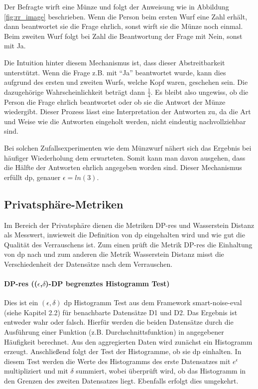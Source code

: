 Der Befragte wirft eine Münze und folgt der Anweisung wie in Abbildung \cref{fig:rr_image} beschrieben. Wenn die Person beim ersten Wurf eine Zahl erhält, dann beantwortet sie die Frage ehrlich, sonst wirft sie die Münze noch einmal. Beim zweiten Wurf folgt bei Zahl die Beantwortung der Frage mit Nein, sonst mit Ja.

Die Intuition hinter diesem Mechanismus ist, dass dieser Abstreitbarkeit unterstützt. Wenn die Frage z.B. mit \enquote{Ja} beantwortet wurde, kann dies aufgrund des ersten und zweiten Wurfs, welche Kopf waren, geschehen sein. Die dazugehörige Wahrscheinlichkeit beträgt dann $\frac{1}{4}$. 
Es bleibt also ungewiss, ob die Person die Frage ehrlich beantwortet oder ob sie die Antwort der Münze wiedergibt. 
Dieser Prozess lässt eine Interpretation der Antworten zu, da die Art und Weise wie die Antworten eingeholt werden, nicht eindeutig nachvollziehbar sind.

Bei solchen Zufallsexperimenten wie dem Münzwurf nähert sich das Ergebnis bei häufiger Wiederholung dem erwarteten. Somit kann man davon ausgehen, dass die Hälfte der Antworten ehrlich angegeben worden sind. Dieser Mechanismus erfüllt \gls{dp}, genauer $\epsilon = ln(3)$.

\subsection{Privatsphäre-Metriken}
Im Bereich der Privatsphäre dienen die Metriken DP-res und Wasserstein Distanz als Messwert, inwieweit die Definition von \gls{dp} eingehalten wird und wie gut die Qualität des Verrauschens ist. Zum einen prüft die Metrik DP-res die Einhaltung von \gls{dp} nach und zum anderen die Metrik Wasserstein Distanz misst die Verschiedenheit der Datensätze nach dem Verrauschen.

\paragraph{DP-res (($\epsilon$,$\delta$)-DP begrenztes Histogramm Test)}
Dies ist ein $(\epsilon, \delta)$ \gls{dp} Histogramm Test aus dem Framework smart-noise-eval (siehe Kapitel 2.2) für benachbarte Datensätze D1 und D2. Das Ergebnis ist entweder wahr oder falsch.
Hierfür werden die beiden Datensätze durch die Ausführung einer Funktion (z.B. Durchschnittsfunktion) in angegebener Häufigkeit berechnet. Aus den aggregierten Daten wird zunächst ein Histogramm erzeugt. Anschließend folgt der Test der Histogramme, ob sie \gls{dp} einhalten. In diesem Test werden die Werte des Histogramms des erste Datensatzes mit $e^\epsilon$ multipliziert und mit $\delta$ summiert, wobei überprüft wird, ob das Histogramm in den Grenzen des zweiten Datensatzes liegt. Ebenfalls erfolgt dies umgekehrt.

